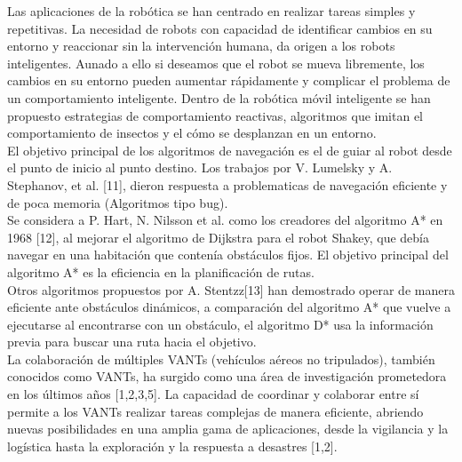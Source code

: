 \documentclass[11pt,epsf,times]{article}
\begin{document}
Las aplicaciones de la robótica se han centrado en realizar tareas simples y repetitivas. La necesidad de robots con capacidad de identificar cambios en su entorno y reaccionar sin la intervención humana, da origen a los robots inteligentes. Aunado a ello si deseamos que el robot se mueva libremente, los cambios en su entorno pueden aumentar rápidamente y complicar el problema de un comportamiento inteligente. Dentro de la robótica móvil inteligente se han propuesto estrategias de comportamiento reactivas, algoritmos que imitan el comportamiento de insectos y el cómo se desplanzan en un entorno.\\
El objetivo principal de los algoritmos de navegación es el de guiar al robot desde el punto de inicio al punto destino. Los trabajos por V. Lumelsky y A. Stephanov, et al. [11], dieron respuesta a problematicas de navegación eficiente y de poca memoria (Algoritmos tipo bug).\\
Se considera a P. Hart, N. Nilsson et al. como los creadores del algoritmo A* en 1968 [12], al mejorar el algoritmo de Dijkstra para el robot Shakey, que debía navegar en una habitación que contenía obstáculos fijos. El objetivo principal del algoritmo A* es la eficiencia en la planificación de rutas.\\
Otros algoritmos propuestos por A. Stentzz[13] han demostrado operar de manera eficiente ante obstáculos dinámicos, a comparación del algoritmo A* que vuelve a ejecutarse al encontrarse con un obstáculo, el algoritmo D* usa la información previa para buscar una ruta hacia el objetivo.\\


La colaboración de múltiples VANTs (vehículos aéreos no tripulados), también conocidos como VANTs, ha surgido como una área de investigación prometedora en los últimos años [1,2,3,5]. La capacidad de coordinar y colaborar entre sí permite a los VANTs realizar tareas complejas de manera eficiente, abriendo nuevas posibilidades en una amplia gama de aplicaciones, desde la vigilancia y la logística hasta la exploración y la respuesta a desastres [1,2].\\
\end{document}
